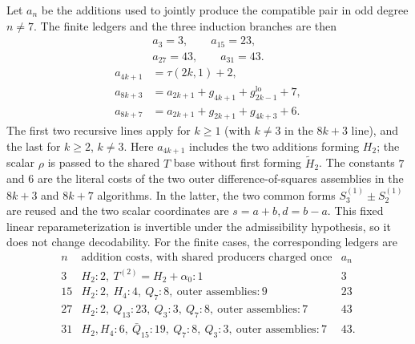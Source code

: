 Let $a_n$ be the additions used to jointly produce the compatible pair in
odd degree $n\ne7$.  The finite ledgers and the three induction branches are
then
\begin{equation}
 \begin{gathered}
 a_3=3,\qquad a_{15}=23,\\
 a_{27}=43,\qquad a_{31}=43.
 \end{gathered}
 \label{eq:pair-add-bases}
\end{equation}
\begin{align}
 a_{4k+1}&=\tau(2k,1)+2,
 \label{eq:pair-add-4k1}\\
 a_{8k+3}&=a_{2k+1}+g_{4k+1}+g^{\mathrm{lo}}_{2k-1}+7,
 \label{eq:pair-add-8k3}\\
 a_{8k+7}&=a_{2k+1}+g_{2k+1}+g_{4k+3}+6.
 \label{eq:pair-add-8k7}
\end{align}
The first two recursive lines apply for $k\ge1$ (with $k\ne3$ in the
$8k+3$ line), and the last for $k\ge2$, $k\ne3$.
Here $a_{4k+1}$ includes the two additions forming $H_2$; the scalar
$\rho$ is passed to the shared $T$ base without first forming
$\widetilde H_2$.  The constants $7$ and $6$ are the literal costs of the
two outer difference-of-squares assemblies in the $8k+3$ and $8k+7$
algorithms.  In the latter, the two common forms
$S^{(1)}_3\mathbin{\pm}S^{(1)}_2$ are reused and the two scalar coordinates
are $s=a+b,d=b-a$.  This fixed linear reparameterization is invertible under
the admissibility hypothesis, so it does not change decodability.  For the
finite cases, the corresponding ledgers are
\[
\begin{array}{c|l|c}
 n&\text{addition costs, with shared producers charged once}&a_n\\ \hline
 3&H_2:2,\ T^{(2)}=H_2+\alpha_0:1&3\\
 15&H_2:2,\ H_4:4,\ Q_7:8,\ \text{outer assemblies}:9&23\\
 27&H_2:2,\ Q_{13}:23,\ Q_3:3,\ Q_7:8,\
       \text{outer assemblies}:7&43\\
 31&H_2,H_4:6,\ \bar Q_{15}:19,\ Q_7:8,\ Q_3:3,\
       \text{outer assemblies}:7&43.
\end{array}
\]

